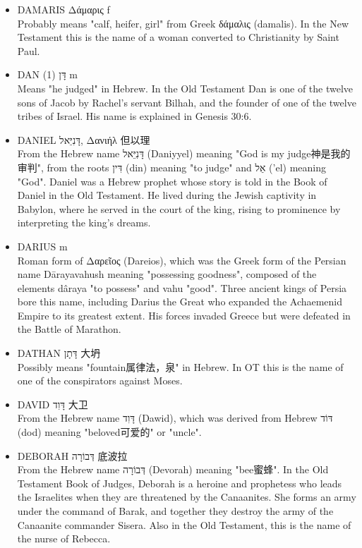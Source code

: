 \begin{itemize} 
\itemsep-.25em
\item {DAMARIS Δάμαρις f}\\
Probably means "calf, heifer, girl" from Greek δάμαλις (damalis). In the New Testament this is the name of a woman converted to Christianity by Saint Paul.

\item {DAN (1) דָּן m}\\
Means "he judged" in Hebrew. In the Old Testament Dan is one of the twelve sons of Jacob by Rachel's servant Bilhah, and the founder of one of the twelve tribes of Israel. His name is explained in Genesis 30:6.

\item {DANIEL דָּנִיֵּאל, Δανιήλ 但以理}\\
From the Hebrew name דָּנִיֵּאל (Daniyyel) meaning "God is my judge神是我的审判", from the roots דִּין (din) meaning "to judge" and אֵל ('el) meaning "God". Daniel was a Hebrew prophet whose story is told in the Book of Daniel in the Old Testament. He lived during the Jewish captivity in Babylon, where he served in the court of the king, rising to prominence by interpreting the king's dreams. 

\item {DARIUS m}\\
Roman form of Δαρεῖος (Dareios), which was the Greek form of the Persian name Dārayavahush meaning "possessing goodness", composed of the elements dâraya "to possess" and vahu "good". Three ancient kings of Persia bore this name, including Darius the Great who expanded the Achaemenid Empire to its greatest extent. His forces invaded Greece but were defeated in the Battle of Marathon.

\item {DATHAN דָּתָן 大坍}\\
Possibly means "fountain属律法，泉" in Hebrew. In OT this is the name of one of the conspirators against Moses.

\item {DAVID דָּוִד 大卫}\\
From the Hebrew name דָּוִד (Dawid), which was derived from Hebrew דּוֹד (dod) meaning "beloved可爱的" or "uncle". 

\item {DEBORAH דְּבוֹרָה 底波拉}\\
From the Hebrew name דְּבוֹרָה (Devorah) meaning "bee蜜蜂". In the Old Testament Book of Judges, Deborah is a heroine and prophetess who leads the Israelites when they are threatened by the Canaanites. She forms an army under the command of Barak, and together they destroy the army of the Canaanite commander Sisera. Also in the Old Testament, this is the name of the nurse of Rebecca.


\end{itemize}
